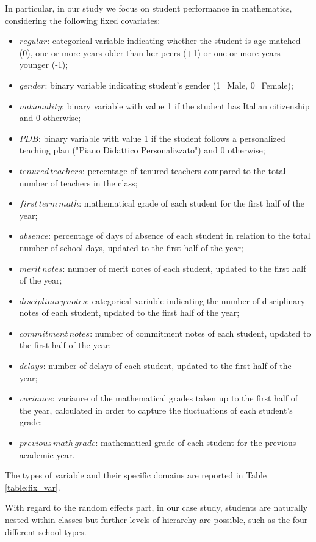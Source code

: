 In particular, in our study we focus on student performance in mathematics, considering the following fixed covariates:
\begin{itemize}
    \item \(regular\): categorical variable indicating whether the student is age-matched (0), one or more years older than her peers (+1) or one or more years younger (-1);
    \item \(gender\): binary variable indicating student's gender (1=Male, 0=Female);
    \item \(nationality\): binary variable with value 1 if the student has Italian citizenship and 0 otherwise;
    \item \(PDB\): binary variable with value 1 if the student follows a personalized teaching plan ("Piano Didattico Personalizzato") and 0 otherwise;
    \item \(tenured \, teachers\): percentage of tenured teachers compared to the total number of teachers in the class;
    \item \(first \, term \, math\): mathematical grade of each student for the first half of the year;
    \item \(absence\): percentage of days of absence of each student in relation to the total number of school days, updated to the first half of the year;
    \item \(merit \, notes\): number of merit notes of each student, updated to the first half of the year;
    \item \(disciplinary \, notes\): categorical variable indicating the number of disciplinary notes of each student, updated to the first half of the year;
    \item \(commitment \, notes\): number of commitment notes of each student, updated to the first half of the year;
    \item \(delays\): number of delays of each student, updated to the first half of the year;
    \item \(variance\): variance of the mathematical grades taken up to the first half of the year, calculated in order to capture the fluctuations of each student's grade;
    \item \(previous \, math \, grade\): mathematical grade of each student for the previous academic year.
\end{itemize}
The types of variable and their specific domains are reported in Table \ref{table:fix_var}.

With regard to the random effects part, in our case study, students are naturally nested within classes but further levels of hierarchy are possible, such as the four different school types.


